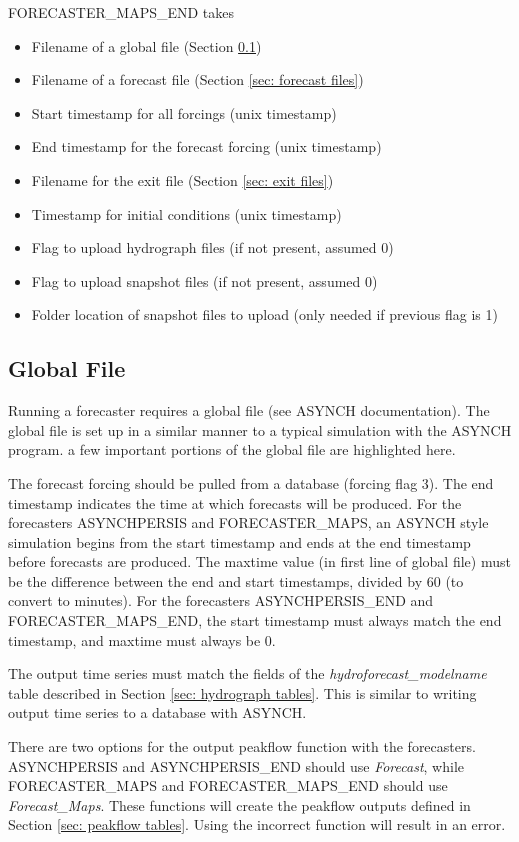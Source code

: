 \documentclass[12pt]{article}
\begin{document}
FORECASTER\_MAPS\_END takes
\begin{itemize}
 \item Filename of a global file (Section \ref{sec: global file})
 \item Filename of a forecast file (Section \ref{sec: forecast files})
 \item Start timestamp for all forcings (unix timestamp)
 \item End timestamp for the forecast forcing (unix timestamp)
 \item Filename for the exit file (Section \ref{sec: exit files})
 \item Timestamp for initial conditions (unix timestamp)
 \item Flag to upload hydrograph files (if not present, assumed 0)
 \item Flag to upload snapshot files (if not present, assumed 0)
 \item Folder location of snapshot files to upload (only needed if previous flag is 1)
\end{itemize}


\subsection{Global File} \label{sec: global file}

Running a forecaster requires a global file (see ASYNCH documentation). The global file is set up in a similar manner to a typical simulation with the ASYNCH program. a few important portions of the global file are highlighted here.

The forecast forcing should be pulled from a database (forcing flag 3). The end timestamp indicates the time at which forecasts will be produced. For the forecasters ASYNCHPERSIS and FORECASTER\_MAPS, an ASYNCH style simulation begins from the start timestamp and ends at the end timestamp before forecasts are produced. The maxtime value (in first line of global file) must be the difference between the end and start timestamps, divided by 60 (to convert to minutes). For the forecasters ASYNCHPERSIS\_END and FORECASTER\_MAPS\_END, the start timestamp must always match the end timestamp, and maxtime must always be 0.

The output time series must match the fields of the \emph{hydroforecast\_modelname} table described in Section \ref{sec: hydrograph tables}. This is similar to writing output time series to a database with ASYNCH.

There are two options for the output peakflow function with the forecasters. ASYNCHPERSIS and ASYNCHPERSIS\_END should use \emph{Forecast}, while FORECASTER\_MAPS and FORECASTER\_MAPS\_END should use \emph{Forecast\_Maps}. These functions will create the peakflow outputs defined in Section \ref{sec: peakflow tables}. Using the incorrect function will result in an error.
\end{document}
